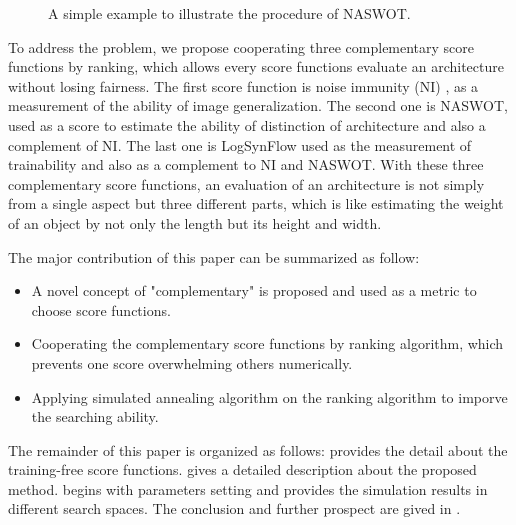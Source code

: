 \documentclass[sigconf]{acmart}
\begin{document}
    \begin{figure*}[b]
        \vspace{-\baselineskip}
        \caption{A simple example to illustrate the procedure of NASWOT.}
        \label{fig:naswot}
        \centering
        \vspace{-\baselineskip}
    \end{figure*}
    To address the problem, we propose cooperating three complementary 
    score functions by ranking, which allows every score functions 
    evaluate an architecture without losing fairness. 
    The first score function is noise immunity (NI) \cite{10092788}, as 
    a measurement of the ability of image generalization. 
    The second one is NASWOT, used as a score to estimate the ability of distinction 
    of architecture and also a complement of NI. 
    The last one is LogSynFlow used as the measurement of trainability 
    and also as a complement to NI and NASWOT. 
    With these three complementary score functions, an evaluation of an 
    architecture is not simply from a single aspect but three different 
    parts, which is like estimating the weight of an object by not only 
    the length but its height and width. 

    The major contribution of this paper can be summarized as follow:
    \begin{itemize}
        \item A novel concept of "complementary" is proposed and used as a metric to choose score functions. 
        \item Cooperating the complementary score functions by ranking algorithm, which prevents one score overwhelming others numerically. 
        \item Applying simulated annealing algorithm on the ranking algorithm to imporve the searching ability. 
    \end{itemize}
    
    The remainder of this paper is organized as follows: 
     provides the detail about the training-free 
    score functions.  gives a detailed 
    description about the proposed method.  begins 
    with parameters setting and provides the simulation results in 
    different search spaces. The conclusion and further 
    prospect are gived in .
\end{document}

